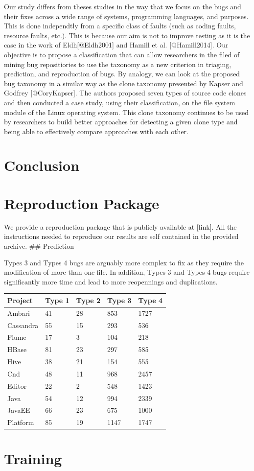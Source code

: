Our study differs from theses studies in the way that we focus on the
bugs and their fixes across a wide range of systems, programming
languages, and purposes. This is done independtly from a specific class
of faults (such as coding faults, resource faults, etc.). This is
because our aim is not to improve testing as it is the case in the work
of Eldh{[}@Eldh2001{]} and Hamill et al. {[}@Hamill2014{]}. Our
objective is to propose a classification that can allow researchers in
the filed of mining bug repositiories to use the taxonomy as a new
criterion in triaging, prediction, and reproduction of bugs. By analogy,
we can look at the proposed bug taxonomy in a similar way as the clone
taxonomy presented by Kapser and Godfrey {[}@CoryKapser{]}. The authors
proposed seven types of source code clones and then conducted a case
study, using their classification, on the file system module of the
Linux operating system. This clone taxonomy continues to be used by
researchers to build better approaches for detecting a given clone type
and being able to effectively compare approaches with each other.

\section{Conclusion}\label{conclusion}

\section{Reproduction Package}\label{reproduction-package}

We provide a reproduction package that is publicly available at
{[}link{]}. All the instructions needed to reproduce our results are
self contained in the provided archive. \#\# Prediction

Types 3 and Types 4 bugs are arguably more complex to fix as they
require the modification of more than one file. In addition, Types 3 and
Types 4 bugs require significantly more time and lead to more
reopennings and duplications.

\begin{longtable}[c]{@{}lllll@{}}
\toprule
Project & Type 1 & Type 2 & Type 3 & Type 4\tabularnewline
\midrule
\endhead
Ambari & 41 & 28 & 853 & 1727\tabularnewline
Cassandra & 55 & 15 & 293 & 536\tabularnewline
Flume & 17 & 3 & 104 & 218\tabularnewline
HBase & 81 & 23 & 297 & 585\tabularnewline
Hive & 38 & 21 & 154 & 555\tabularnewline
Cnd & 48 & 11 & 968 & 2457\tabularnewline
Editor & 22 & 2 & 548 & 1423\tabularnewline
Java & 54 & 12 & 994 & 2339\tabularnewline
JavaEE & 66 & 23 & 675 & 1000\tabularnewline
Platform & 85 & 19 & 1147 & 1747\tabularnewline
\bottomrule
\end{longtable}

\section{Training}\label{training}
